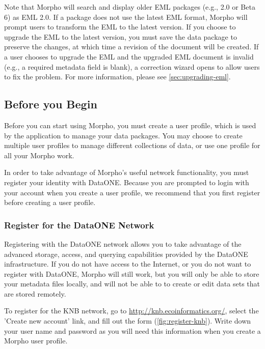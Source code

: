 Note that Morpho will search and display older EML packages (e.g., 2.0
or Beta 6) as EML 2.0. If a package does not use the latest EML format,
Morpho will prompt users to transform the EML to the latest version. If
you choose to upgrade the EML to the latest version, you must save the
data package to preserve the changes, at which time a revision of the 
document will be created. If a user chooses to upgrade the
EML and the upgraded EML document is invalid (e.g., a required metadata
field is blank), a correction wizard opens to allow users to fix the
problem. For more information, please see \autoref{sec:upgrading-eml}.

\subsection{Before you Begin} \label{sec:before-you-begin}

Before you can start using Morpho, you must create a user profile, which
is used by the application to manage your data packages. You may choose
to create multiple user profiles to manage different collections of
data, or use one profile for all your Morpho work. 

In order to take advantage of Morpho's useful network functionality, you
must register your identity with DataONE.  Because you are prompted to
login with your account when you create a user profile,
we recommend that you first register before creating a user profile.

\subsubsection{Register for the DataONE Network} \label{sec:register}

Registering with the DataONE network allows you to take advantage of the
advanced storage, access, and querying capabilities provided by the
DataONE infrastructure. If you do not have access to the Internet, or you do not
want to register with DataONE, Morpho will still work, but you will only
be able to store your metadata files locally, and will not be able to
to create or edit data sets that are stored remotely.

To register for the KNB network, go to
\url{http://knb.ecoinformatics.org/}, select the 'Create new account'
link, and fill out the form (\autoref{fig:register-knb}). Write down
your user name and password as you will need this information when you
create a Morpho user profile.

